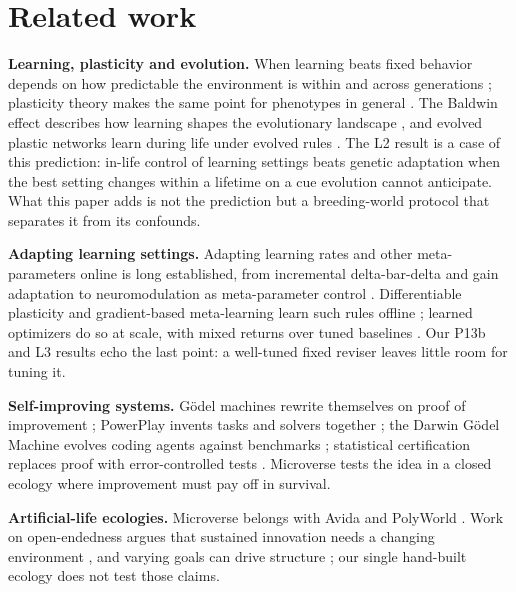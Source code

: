 \documentclass[11pt]{article}
\begin{document}
\section{Related work}
\label{sec:related}

\textbf{Learning, plasticity and evolution.} When learning beats fixed behavior depends on how predictable the environment is within and across generations \citep{stephens1991change,dunlap2009components,dunlap2016reliability}; plasticity theory makes the same point for phenotypes in general \citep{westeberhard2003developmental}. The Baldwin effect describes how learning shapes the evolutionary landscape \citep{baldwin1896new,hinton1987learning}, and evolved plastic networks learn during life under evolved rules \citep{soltoggio2008evolutionary,soltoggio2018born,fernando2018meta,najarro2020meta}. The L2 result is a case of this prediction: in-life control of learning settings beats genetic adaptation when the best setting changes within a lifetime on a cue evolution cannot anticipate. What this paper adds is not the prediction but a breeding-world protocol that separates it from its confounds.

\textbf{Adapting learning settings.} Adapting learning rates and other meta-parameters online is long established, from incremental delta-bar-delta \citep{sutton1992adapting} and gain adaptation \citep{schraudolph1999local} to neuromodulation as meta-parameter control \citep{doya2002metalearning}. Differentiable plasticity and gradient-based meta-learning learn such rules offline \citep{miconi2018differentiable,miconi2020backpropamine,finn2017model,hospedales2022meta}; learned optimizers do so at scale, with mixed returns over tuned baselines \citep{metz2022velo,rezk2023scaling}. Our P13b and L3 results echo the last point: a well-tuned fixed reviser leaves little room for tuning it.

\textbf{Self-improving systems.} G\"odel machines rewrite themselves on proof of improvement \citep{schmidhuber2007godel}; PowerPlay invents tasks and solvers together \citep{schmidhuber2013powerplay}; the Darwin G\"odel Machine evolves coding agents against benchmarks \citep{zhang2025darwin}; statistical certification replaces proof with error-controlled tests \citep{wu2025sgm}. Microverse tests the idea in a closed ecology where improvement must pay off in survival.

\textbf{Artificial-life ecologies.} Microverse belongs with Avida and PolyWorld \citep{ofria2004avida,yaeger1994polyworld}. Work on open-endedness argues that sustained innovation needs a changing environment \citep{bedau2000open,taylor2015requirements,wang2019poet,clune2019aigas,faldor2024omni}, and varying goals can drive structure \citep{kashtan2005spontaneous}; our single hand-built ecology does not test those claims.
\end{document}
